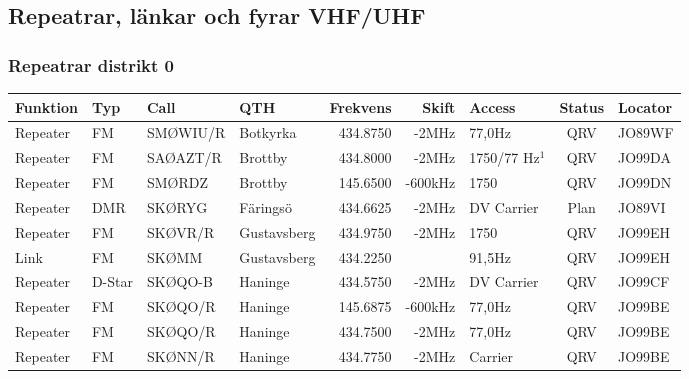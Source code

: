 \begin{landscape}
\subsection{Repeatrar, länkar och fyrar VHF/UHF}
\subsubsection{Repeatrar distrikt 0}
\footnotesize
\begin{longtable}{llllrrlcl}
	\textbf{Funktion} & \textbf{Typ} & \textbf{Call} & \textbf{QTH} & \textbf{Frekvens} & \textbf{Skift} & \textbf{Access} & \textbf{Status} & \textbf{Locator} \\ \hline
	\endhead
	Repeater          & FM           & SMØWIU/R      & Botkyrka     & 434.8750          & -2MHz          & 77,0Hz          & QRV             & JO89WF           \\
	Repeater          & FM           & SAØAZT/R      & Brottby      & 434.8000          & -2MHz          & 1750/77 Hz$^1$  & QRV             & JO99DA           \\
	Repeater          & FM           & SMØRDZ        & Brottby      & 145.6500          & -600kHz        & 1750            & QRV             & JO99DN           \\
	Repeater          & DMR          & SKØRYG        & Färingsö     & 434.6625          & -2MHz          & DV Carrier      & Plan            & JO89VI           \\
	Repeater          & FM           & SKØVR/R       & Gustavsberg  & 434.9750          & -2MHz          & 1750            & QRV             & JO99EH           \\
	Link              & FM           & SKØMM         & Gustavsberg  & 434.2250          &                & 91,5Hz          & QRV             & JO99EH           \\
	Repeater          & D-Star       & SKØQO-B       & Haninge      & 434.5750          & -2MHz          & DV Carrier      & QRV             & JO99CF           \\
	Repeater          & FM           & SKØQO/R       & Haninge      & 145.6875          & -600kHz        & 77,0Hz          & QRV             & JO99BE           \\
	Repeater          & FM           & SKØQO/R       & Haninge      & 434.7500          & -2MHz          & 77,0Hz          & QRV             & JO99BE           \\
	Repeater          & FM           & SKØNN/R       & Haninge      & 434.7750          & -2MHz          & Carrier         & QRV             & JO99BE           \\

\end{longtable}
\end{landscape}
